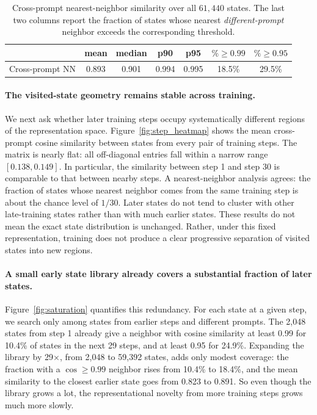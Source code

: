 \documentclass{article}
\theoremstyle{remark}
\begin{document}
\begin{table}[t]
\centering
\small
\caption{Cross-prompt nearest-neighbor similarity over all $61{,}440$ states.
The last two columns report the fraction of states whose nearest
\emph{different-prompt} neighbor exceeds the corresponding threshold.}
\label{tab:nn_stats}
\begin{tabular}{lcccccc}
\toprule
 & mean & median & p90 & p95 & $\%\geq 0.99$ & $\%\geq 0.95$ \\
\midrule
Cross-prompt NN & 0.893 & 0.901 & 0.994 & 0.995 & 18.5\% & 29.5\% \\
\bottomrule
\end{tabular}
\end{table}

\paragraph{The visited-state geometry remains stable across training.}
We next ask whether later training steps occupy systematically different regions of the representation space. Figure~\ref{fig:step_heatmap} shows the mean cross-prompt cosine similarity between states from every pair of training steps. The matrix is nearly flat: all off-diagonal entries fall within a narrow range \([0.138, 0.149]\). In particular, the similarity between step 1 and step 30 is comparable to that between nearby steps. A nearest-neighbor analysis agrees: the fraction of states whose nearest neighbor comes from the same training step is about the chance level of \(1/30\). Later states do not tend to cluster with other late-training states rather than with much earlier states. These results do not mean the exact state distribution is unchanged. Rather, under this fixed representation, training does not produce a clear progressive separation of visited states into new regions.

\paragraph{A small early state library already covers a substantial fraction of later states.}
Figure~\ref{fig:saturation} quantifies this redundancy. For each state at a given step, we search only among states from earlier steps and different prompts. The 2,048 states from step 1 already give a neighbor with cosine similarity at least 0.99 for 10.4\% of states in the next 29 steps, and at least 0.95 for 24.9\%. Expanding the library by 29\(\times\), from 2,048 to 59,392 states, adds only modest coverage: the fraction with a \(\cos \ge 0.99\) neighbor rises from 10.4\% to 18.4\%, and the mean similarity to the closest earlier state goes from 0.823 to 0.891. So even though the library grows a lot, the representational novelty from more training steps grows much more slowly.
\end{document}
